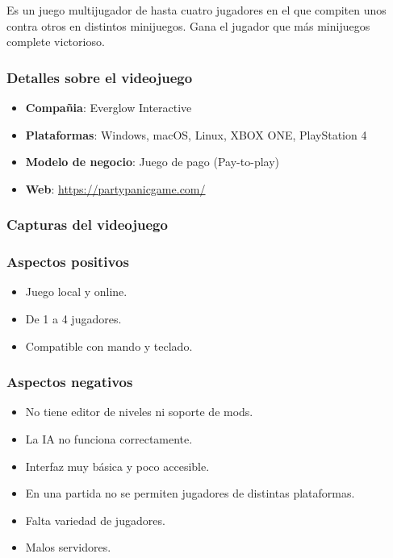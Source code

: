 \documentclass[12pt, spanish]{article}
\begin{document}
Es un juego multijugador de hasta cuatro jugadores en el que compiten unos contra otros en distintos minijuegos. Gana el jugador que más minijuegos complete victorioso.

\subsubsection{Detalles sobre el videojuego}

\begin{itemize}
	\item \textbf{Compañia}: Everglow Interactive
	\item \textbf{Plataformas}: Windows, macOS, Linux, XBOX ONE, PlayStation 4
	\item \textbf{Modelo de negocio}: Juego de pago (Pay-to-play)
	\item \textbf{Web}: \url{https://partypanicgame.com/}
\end{itemize}

\subsubsection{Capturas del videojuego}


\subsubsection{Aspectos positivos}

\begin{itemize}
	\item Juego local y online.
	\item De 1 a 4 jugadores.
	\item Compatible con mando y teclado.
\end{itemize}

\subsubsection{Aspectos negativos}

\begin{itemize}
	\item No tiene editor de niveles ni soporte de mods.
	\item La IA no funciona correctamente.
	\item Interfaz muy básica y poco accesible.
	\item En una partida no se permiten jugadores de distintas plataformas.
	\item Falta variedad de jugadores.
	\item Malos servidores.
\end{itemize}
\end{document}
